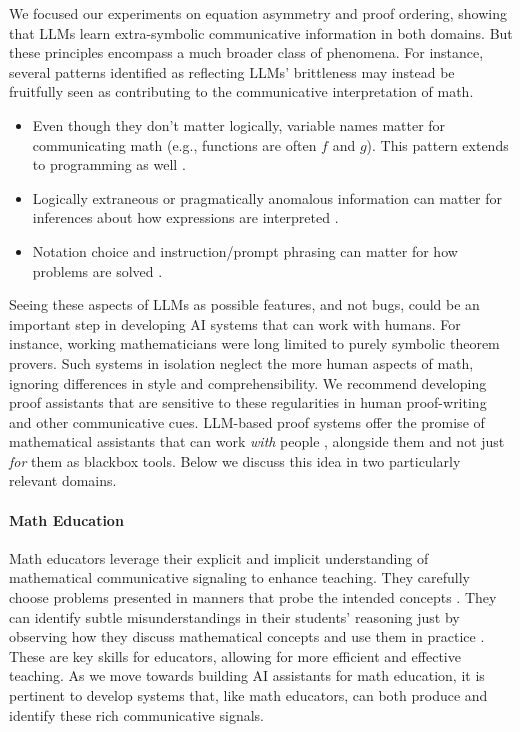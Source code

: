 \documentclass{article}
\begin{document}
We focused our experiments on equation asymmetry and proof ordering, showing that LLMs learn extra-symbolic communicative information in both domains. But these principles encompass a much broader class of phenomena. For instance, several patterns identified as reflecting LLMs' brittleness may instead be fruitfully seen as contributing to the communicative interpretation of math.
\begin{itemize}[topsep=0pt, leftmargin=3mm]
\addtolength\itemsep{-1.2mm}
    \item Even though they don't matter logically, variable names matter for communicating math (e.g., functions are often $f$ and $g$). This pattern extends to programming as well \citep{hersh1998mathematics,miceli2023larger}.
    \item Logically extraneous or pragmatically anomalous information can matter for inferences about how expressions are interpreted \citep{pasolunghi1999working,shi2023large}.
    \item Notation choice and instruction/prompt phrasing can matter for how problems are solved \citep{guccler2014role,iverson1979notation}.
\end{itemize}

Seeing these aspects of LLMs as possible features, and not bugs, could be an important step in developing AI systems that can work with humans.
For instance, working mathematicians were long limited to purely symbolic theorem provers.
Such systems in isolation neglect the more human aspects of math, ignoring differences in style and comprehensibility.
We recommend developing proof assistants that are sensitive to these regularities in human proof-writing and other communicative cues.
LLM-based proof systems offer the promise of mathematical assistants that can work \textit{with} people \citep{collins2024building}, alongside them and not just \textit{for} them as blackbox tools. Below we discuss this idea in two particularly relevant domains.

\paragraph{Math Education}
Math educators leverage their explicit and implicit understanding of mathematical communicative signaling to enhance teaching. They carefully choose problems presented in manners that probe the intended concepts \citep{liz2006exemplification, rowland2008purpose}. They can identify subtle misunderstandings in their students' reasoning just by observing how they discuss mathematical concepts and use them in practice \citep{bray2011collective, kingsdorf2014error, radatz1979error, riccomini2005identification}. These are key skills for educators, allowing for more efficient and effective teaching. As we move towards building AI assistants for math education, it is pertinent to develop systems that, like math educators, can both produce and identify these rich communicative signals.
\end{document}

